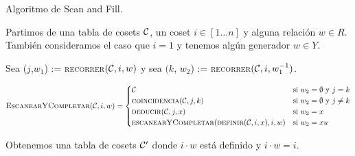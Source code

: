 \documentclass[aspectratio=169, 9pt]{beamer}
\newcommand{\coin}{\textsc{coincidencia}}
\newcommand{\definir}{\textsc{definir}}
\newcommand{\scanfill}{\textsc{escanearYCompletar}}
\newcommand{\ded}{\textsc{deducir}}
\newcommand{\recorrer}{\textsc{recorrer}}
\newcommand{\In}{[1 \dots n]}
\newcommand{\Co}{{\cal{C}}}
\begin{document}
\begin{frame}[fragile]{Algoritmo de Scan and Fill.}
	
		Partimos de una tabla de cosets $\Co$, un coset $i \in \In$ y alguna relación $w \in R$. 
		También consideramos el caso que  $i = 1$ y tenemos algún generador $w \in Y$.
		
		
		{Sea} ($j$,$w_1$) := \recorrer$(\Co, i, w)$ y sea $({k}$, $w_2$) :=  \recorrer$(\Co,i, w_1^{-1})$.
		
		
		\begin{equation*}
			\textsc{EscanearYCompletar}(\Co, i , w) = 
			\begin{cases}
				\Co \ &\text{si} \  w_2 = \emptyset \ \text{y} \ j=k  \\
				\coin({\Co, j,k}) & \text{si} \  w_2 = \emptyset \ \text{y} \ j \neq k   \\
				\ded(\Co, j, x) & \text{si} \ w_2 = x   \\
				\scanfill(\definir(\Co,i,x),i,w) & \text{si} \ w_2 = xu
			\end{cases}
		\end{equation*}
		
		
		Obtenemos una tabla de cosets $\Co'$ donde $i \cdot w$ está definido y $i \cdot w = i$.

	
	
\end{frame}
\end{document}
